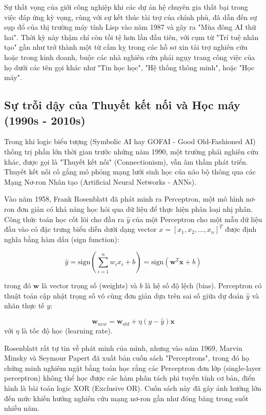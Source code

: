 Sự thất vọng của giới công nghiệp khi các dự án hệ chuyên gia thất bại trong việc đáp ứng kỳ vọng, cùng với sự kết thúc tài trợ của chính phủ, đã dẫn đến sự sụp đổ của thị trường máy tính Lisp vào năm 1987 và gây ra "Mùa đông AI thứ hai". Thời kỳ này thậm chí còn tồi tệ hơn lần đầu tiên, với cụm từ "Trí tuệ nhân tạo" gần như trở thành một từ cấm kỵ trong các hồ sơ xin tài trợ nghiên cứu hoặc trong kinh doanh, buộc các nhà nghiên cứu phải ngụy trang công việc của họ dưới các tên gọi khác như "Tin học học", "Hệ thống thông minh", hoặc "Học máy".

\newpage

\subsection{Sự trỗi dậy của Thuyết kết nối và Học máy (1990s - 2010s)}

Trong khi logic biểu tượng (Symbolic AI hay GOFAI - Good Old-Fashioned AI) thống trị phần lớn thời gian trước những năm 1990, một trường phái nghiên cứu khác, được gọi là "Thuyết kết nối" (Connectionism), vẫn âm thầm phát triển. Thuyết kết nối cố gắng mô phỏng mạng lưới sinh học của não bộ thông qua các Mạng Nơ-ron Nhân tạo (Artificial Neural Networks - ANNs).

Vào năm 1958, Frank Rosenblatt đã phát minh ra Perceptron, một mô hình nơ-ron đơn giản có khả năng học hỏi qua dữ liệu để thực hiện phân loại nhị phân. Công thức toán học cốt lõi cho đầu ra $\hat{y}$ của một Perceptron cho một mẫu dữ liệu đầu vào có đặc trưng biểu diễn dưới dạng vector $x = [x_1, x_2, \dots, x_n]^T$ được định nghĩa bằng hàm dấu (sign function):

\begin{equation}
\hat{y} = \text{sign}\left(\sum_{i=1}^{n} w_i x_i + b\right) = \text{sign}(\mathbf{w}^T \mathbf{x} + b)
\end{equation}

trong đó $\mathbf{w}$ là vector trọng số (weights) và $b$ là hệ số độ lệch (bias). Perceptron có thuật toán cập nhật trọng số vô cùng đơn giản dựa trên sai số giữa dự đoán $\hat{y}$ và nhãn thực tế $y$:

\begin{equation}
\mathbf{w}_{new} = \mathbf{w}_{old} + \eta (y - \hat{y})\mathbf{x}
\end{equation}
với $\eta$ là tốc độ học (learning rate). 

Rosenblatt rất tự tin về phát minh của mình, nhưng vào năm 1969, Marvin Minsky và Seymour Papert đã xuất bản cuốn sách "Perceptrons", trong đó họ chứng minh nghiêm ngặt bằng toán học rằng các Perceptron đơn lớp (single-layer perceptron) không thể học được các hàm phân tách phi tuyến tính cơ bản, điển hình là bài toán logic XOR (Exclusive OR). Cuốn sách này đã gây ảnh hưởng lớn đến mức khiến hướng nghiên cứu mạng nơ-ron gần như đóng băng trong suốt nhiều năm.

